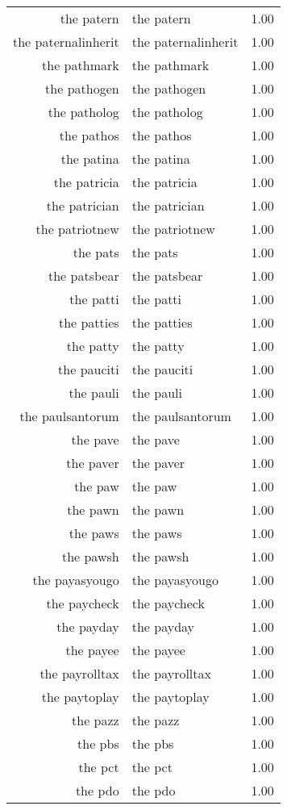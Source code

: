 \begin{table}[ht]
\begin{tabular}{rlr}
  the patern & the patern & 1.00 \\ 
  the paternalinherit & the paternalinherit & 1.00 \\ 
  the pathmark & the pathmark & 1.00 \\ 
  the pathogen & the pathogen & 1.00 \\ 
  the patholog & the patholog & 1.00 \\ 
  the pathos & the pathos & 1.00 \\ 
  the patina & the patina & 1.00 \\ 
  the patricia & the patricia & 1.00 \\ 
  the patrician & the patrician & 1.00 \\ 
  the patriotnew & the patriotnew & 1.00 \\ 
  the pats & the pats & 1.00 \\ 
  the patsbear & the patsbear & 1.00 \\ 
  the patti & the patti & 1.00 \\ 
  the patties & the patties & 1.00 \\ 
  the patty & the patty & 1.00 \\ 
  the pauciti & the pauciti & 1.00 \\ 
  the pauli & the pauli & 1.00 \\ 
  the paulsantorum & the paulsantorum & 1.00 \\ 
  the pave & the pave & 1.00 \\ 
  the paver & the paver & 1.00 \\ 
  the paw & the paw & 1.00 \\ 
  the pawn & the pawn & 1.00 \\ 
  the paws & the paws & 1.00 \\ 
  the pawsh & the pawsh & 1.00 \\ 
  the payasyougo & the payasyougo & 1.00 \\ 
  the paycheck & the paycheck & 1.00 \\ 
  the payday & the payday & 1.00 \\ 
  the payee & the payee & 1.00 \\ 
  the payrolltax & the payrolltax & 1.00 \\ 
  the paytoplay & the paytoplay & 1.00 \\ 
  the pazz & the pazz & 1.00 \\ 
  the pbs & the pbs & 1.00 \\ 
  the pct & the pct & 1.00 \\ 
  the pdo & the pdo & 1.00 \\ 

\end{tabular}
\end{table}
